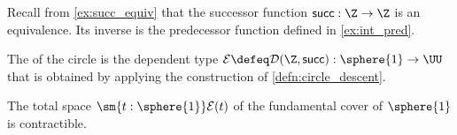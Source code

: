 \begin{comment}
\begin{defn}\label{defn:fiber_sequence}
A \define{fiber sequence} 
\begin{equation*}
F \hookrightarrow E \twoheadrightarrow B
\end{equation*}
consists of a \define{base type} $B$ with a base point $b_0$ and a dependent type $P:B\to\type$, a type $F$ called the \define{fiber} with an equivalence $\eqv{P(b_0)}{F}$, and a type $E$ called the \define{total space} with a map $p:E\to B$ and an equivalence $e:\eqv{(\sm{b:B}P(b))}{E}$ such that the triangle
\begin{equation*}
\begin{tikzcd}
\Big(\sm{b:B}P(b)\Big) \arrow[rr,"e"] \arrow[dr,swap,"\proj 1"] & & E \arrow[dl,"p"] \\
& B
\end{tikzcd}
\end{equation*}
commutes.
\end{defn}
\end{comment}

Recall from \cref{ex:succ_equiv} that the successor function $\mathsf{succ}:\Z\to \Z$ is an equivalence. Its inverse is the predecessor function defined in \cref{ex:int_pred}. 

\begin{defn}
The  of the circle is the dependent type $\mathcal{E}\defeq\mathcal{D}(\Z,\mathsf{succ}):\sphere{1}\to\UU$ that is obtained by applying the construction of \autoref{defn:circle_descent}.
\end{defn}

\begin{thm}
The total space $\sm{t:\sphere{1}}\mathcal{E}(t)$ of the fundamental cover of $\sphere{1}$ is contractible.
\end{thm}

